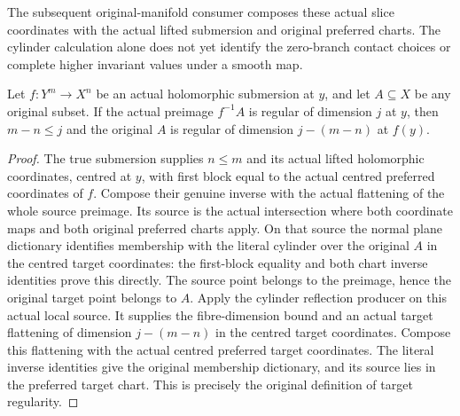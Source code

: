 The subsequent original-manifold consumer composes these actual slice
coordinates with the actual lifted submersion and original preferred charts.
The cylinder calculation alone does not yet identify the zero-branch contact
choices or complete higher invariant values under a smooth map.


\begin{theorem}
\label{hir:smooth-submersion-original-regularity-reflection}
\leanok
{}
Let $f:Y^m\to X^n$ be an actual holomorphic submersion at $y$, and let
$A\subseteq X$ be any original subset.  If the actual preimage $f^{-1}A$
is regular of dimension $j$ at $y$, then $m-n\leq j$ and the original
$A$ is regular of dimension $j-(m-n)$ at $f(y)$.
\end{theorem}
\begin{proof}
The true submersion supplies $n\leq m$ and its actual lifted holomorphic
coordinates, centred at $y$, with first block equal to the actual centred
preferred coordinates of $f$.  Compose their genuine inverse with the
actual flattening of the whole source preimage.  Its source is the actual
intersection where both coordinate maps and both original preferred charts
apply.  On that source the normal plane dictionary identifies membership
with the literal cylinder over the original $A$ in the centred target
coordinates: the first-block equality and both chart inverse identities
prove this directly.  The source point belongs to the preimage, hence the
original target point belongs to $A$.  Apply the cylinder reflection
producer on this actual local source.  It supplies the fibre-dimension bound
and an actual target flattening of dimension $j-(m-n)$ in the centred target
coordinates.  Compose this flattening with the actual centred preferred
target coordinates.  The literal inverse identities give the original
membership dictionary, and its source lies in the preferred target chart.
This is precisely the original definition of target regularity.
\end{proof}


